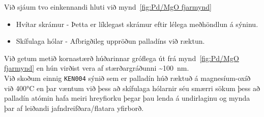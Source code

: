 \documentclass[11pt]{article}
\begin{document}
Við sjáum tvo einkennandi hluti við mynd~\ref{fig:Pd/MgO fjarmynd}

\begin{itemize}
    \item Hvítar skrámur - Þetta er líklegast skrámur eftir lélega meðhöndlun á sýninu.
    \item Skífulaga hólar - Afbrigðileg uppröðun palladíns við ræktun.
\end{itemize}
Við getum metið kornastærð húðarinnar gróflega út frá mynd~\ref{fig:Pd/MgO fjarmynd} en hún virðist vera af stærðargráðunni \sim\SI{100}{nm}.\\


Við skoðum einnig {\tt KEN004} sýnið sem er palladín húð ræktuð á magnesíum-oxíð við \ang{400}C en þar væntum við þess að skífulaga hólarnir séu smærri sökum þess að palladín atómin hafa meiri hreyfiorku þegar þau lenda á undirlaginu og mynda þar af leiðandi jafndreifðara/flatara yfirborð.
\end{document}
